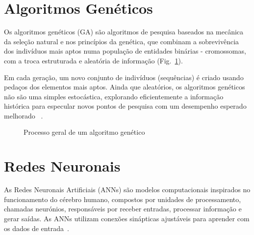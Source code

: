 \documentclass[a4paper, portuguese]{report}
\begin{document}
\section{Algoritmos Genéticos}\label{sec:gen_algs}

Os algoritmos genéticos (GA) são algoritmos de pesquisa baseados na mecânica da seleção natural e nos princípios da genética, que combinam a sobrevivência dos indivíduos mais aptos numa população de entidades binárias - cromossomas, com a troca estruturada e aleatória de informação (Fig.~\ref{fig:ea_flowchart}). 

Em cada geração, um novo conjunto de indivíduos (sequências) é criado usando pedaços dos elementos mais aptos. Ainda que aleatórios, os  algoritmos genéticos não são uma simples  estocástica, explorando eficientemente a informação histórica para especular novos pontos de pesquisa com um desempenho esperado melhorado ~\cite{Goldberg1989GeneticLearning}.

\begin{figure}[htbp]
\centering
{}
\caption{Processo geral de um algoritmo genético}
\label{fig:ea_flowchart}
\end{figure}

\section{Redes Neuronais}\label{sec:neural_nets}

As Redes Neuronais Artificiais (ANNs) são modelos computacionais inspirados no funcionamento do cérebro humano, compostos por unidades de processamento, chamadas neurónios, responsáveis por receber entradas, processar informação e gerar saídas. As ANNs utilizam conexões sinápticas ajustáveis para aprender com os dados de entrada~\cite{Lippmann1988AnNets}.
\end{document}
